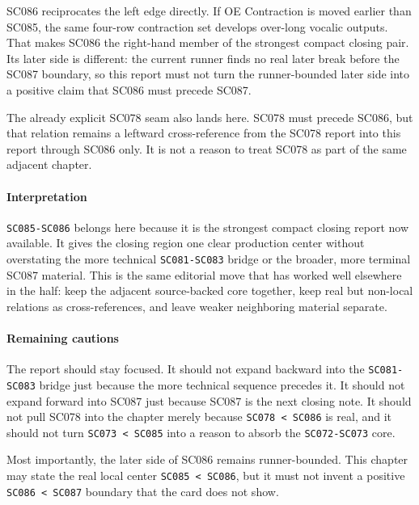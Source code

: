 \documentclass[
  british,
  a4paper,
]{article}
\begin{document}
SC086 reciprocates the left edge directly. If OE Contraction is moved
earlier than SC085, the same four-row contraction set develops over-long
vocalic outputs. That makes SC086 the right-hand member of the strongest
compact closing pair. Its later side is different: the current runner
finds no real later break before the SC087 boundary, so this report must
not turn the runner-bounded later side into a positive claim that SC086
must precede SC087.

The already explicit SC078 seam also lands here. SC078 must precede
SC086, but that relation remains a leftward cross-reference from the
SC078 report into this report through SC086 only. It is not a reason to
treat SC078 as part of the same adjacent chapter.

\paragraph{Interpretation}\label{interpretation-51}

\texttt{SC085-SC086} belongs here because it is the strongest compact
closing report now available. It gives the closing region one clear
production center without overstating the more technical
\texttt{SC081-SC083} bridge or the broader, more terminal SC087
material. This is the same editorial move that has worked well elsewhere
in the half: keep the adjacent source-backed core together, keep real
but non-local relations as cross-references, and leave weaker
neighboring material separate.

\paragraph{Remaining cautions}\label{remaining-cautions-51}

The report should stay focused. It should not expand backward into the
\texttt{SC081-SC083} bridge just because the more technical sequence
precedes it. It should not expand forward into SC087 just because SC087
is the next closing note. It should not pull SC078 into the chapter
merely because \texttt{SC078\ \textless{}\ SC086} is real, and it should
not turn \texttt{SC073\ \textless{}\ SC085} into a reason to absorb the
\texttt{SC072-SC073} core.

Most importantly, the later side of SC086 remains runner-bounded. This
chapter may state the real local center
\texttt{SC085\ \textless{}\ SC086}, but it must not invent a positive
\texttt{SC086\ \textless{}\ SC087} boundary that the card does not show.
\end{document}

